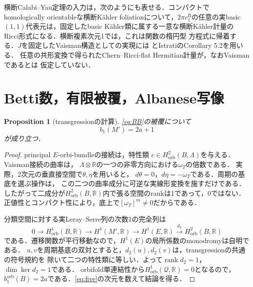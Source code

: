 \documentclass[12pt]{amsart}
\newtheorem{prop}[thm]{Proposition}
\theoremstyle{definition}
\theoremstyle{remark}
\numberwithin{equation}{section}
\newcommand{\rank}{\operatorname{rank}}
\newcommand{\orb}{\mathrm{orb}}
\newcommand{\R}{\mathbb{R}}
\newcommand{\bas}{\mathrm{B}}
\newcommand{\wt}{\omega_{T}}
\newcommand{\Qfac}{\mathcal{Q}}
\begin{document}
横断Calabi--Yau定理の入力は，次のようにも表せる．コンパクトでhomologically
orientableな横断K\"ahler foliationについて，$2\pi c_1^{\bas}$の任意の実basic
$(1,1)$代表元は，固定したbasic K\"ahler類に属する一意な横断K\"ahler計量の
Ricci形式になる\cite[Section 3.5.5]{EK}．横断複素次元1では，これは関数の楕円型
方程式に帰着する．$J$を固定したVaisman構造としての実現には
\cite[Theorem 4.1, Lemma 4.2]{OV}とIstratiのCorollary 5.2を用いる．
任意の共形変換で得られたChern--Ricci-flat Hermitian計量が，なおVaismanであるとは
仮定していない．

\section{Betti数，有限被覆，Albanese写像}\label{sec:betti}
\begin{prop}[transgressionの計算]\label{prop:betti}
\eqref{eq:BB}の被覆について
\begin{equation}\label{eq:betti}
b_1(M')=2a+1
\end{equation}
が成り立つ．
\end{prop}
\begin{proof}
principal $E$-orbi-bundleの接続は，特性類
$c\in H^2_{\orb}(B,\Lambda)$を与える．Vaisman接続の曲率は，
$\Lambda\otimes\R$の一つの非零方向における$\wt$の倍数である．
実際，2次元の垂直接空間で$\theta,\eta$を用いると，
$d\theta=0$，$d\eta=-\wt$である．周期の基底を選ぶ操作は，
この二つの曲率成分に可逆な実線形変換を施すだけである．
したがって二成分が$H^2_{\orb}(B,\R)$内で張る空間のrankは1であって，0ではない．
正値性とコンパクト性により，底上で$[\wt]^m\ne0$だからである．

分類空間に対する実Leray--Serre列の次数1の完全列は
\begin{equation}\label{eq:five}
0\longrightarrow H^1_{\orb}(B,\R)\longrightarrow H^1(M',\R)
\longrightarrow H^1(E,\R)\xrightarrow{d_2}H^2_{\orb}(B,\R)
\end{equation}
である．遷移関数が平行移動なので，$H^1(E)$の局所係数のmonodromyは自明である．
$u,v$を周期基底の双対とすると，$d_2(u),d_2(v)$は，transgressionの共通の符号規約を
除いて二つの特性類に等しい．よって$\rank d_2=1$，$\dim\ker d_2=1$である．
orbifold単連結性から$H^1_{\orb}(\Qfac,\R)=0$となるので，
$b_1^{\orb}(B)=2a$である．\eqref{eq:five}の次元を数えて結論を得る．
\end{proof}
\end{document}
